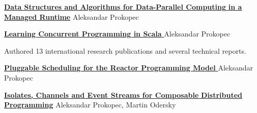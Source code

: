 \documentclass[9pt]{article}
\begin{document}



\medskip

\noindent\href{http://infoscience.epfl.ch/record/200977/files/EPFL_TH6264.pdf}
{\bf Data Structures and Algorithms for Data-Parallel Computing }
\newline
\noindent\href{http://infoscience.epfl.ch/record/200977/files/EPFL_TH6264.pdf}
{\bf in a Managed Runtime}
\newline
\noindent Aleksandar Prokopec
\bigskip


\medskip

\noindent\href{http://www.amazon.com/Learning-Concurrent-Programming-Aleksandar-Prokopec/dp/1783281413/}
{\bf Learning Concurrent Programming in Scala }
\newline
\noindent Aleksandar Prokopec
\bigskip




\noindent
Authored 13 international research publications
and several technical reports.
\newline


\noindent\href{http://axel22.github.io/resources/docs/reactor-scheduler.pdf}
{\bf Pluggable Scheduling for the Reactor Programming Model }
\newline
\noindent Aleksandar Prokopec
\newline
{}
\bigskip


\noindent\href{http://axel22.github.io/resources/docs/reactors.pdf}
{\bf Isolates, Channels and Event Streams for Composable }
\newline
\noindent\href{http://axel22.github.io/resources/docs/reactive-isolates.pdf}
{\bf Distributed Programming}
\dates{}
\newline\noindent Aleksandar Prokopec, Martin Odersky
\newline
{}
\medskip
\end{document}
